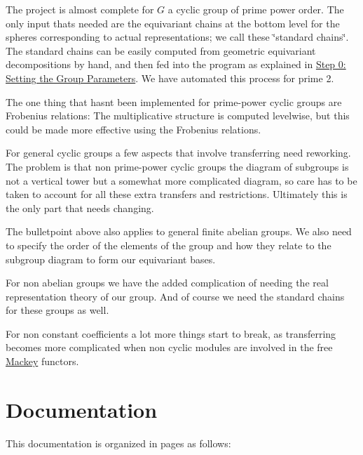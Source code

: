 \begin{DoxyItemize}
\item The project is almost complete for $G$ a cyclic group of prime power order. The only input that\textquotesingle{}s needed are the equivariant chains at the bottom level for the spheres corresponding to actual representations; we call these \char`\"{}standard chains\char`\"{}. The standard chains can be easily computed from geometric equivariant decompositions by hand, and then fed into the program as explained in \hyperlink{use_how}{Step 0\+: Setting the Group Parameters}. We have automated this process for prime 2.
\item The one thing that hasn\textquotesingle{}t been implemented for prime-\/power cyclic groups are Frobenius relations\+: The multiplicative structure is computed levelwise, but this could be made more effective using the Frobenius relations.
\item For general cyclic groups a few aspects that involve transferring need reworking. The problem is that non prime-\/power cyclic groups the diagram of subgroups is not a vertical tower but a somewhat more complicated diagram, so care has to be taken to account for all these extra transfers and restrictions. Ultimately this is the only part that needs changing.
\item The bulletpoint above also applies to general finite abelian groups. We also need to specify the order of the elements of the group and how they relate to the subgroup diagram to form our equivariant bases.
\item For non abelian groups we have the added complication of needing the real representation theory of our group. And of course we need the standard chains for these groups as well.
\item For non constant coefficients a lot more things start to break, as transferring becomes more complicated when non cyclic modules are involved in the free \hyperlink{namespaceMackey}{Mackey} functors.
\end{DoxyItemize}\hypertarget{index_doc}{}\section{Documentation}\label{index_doc}
This documentation is organized in pages as follows\+:


